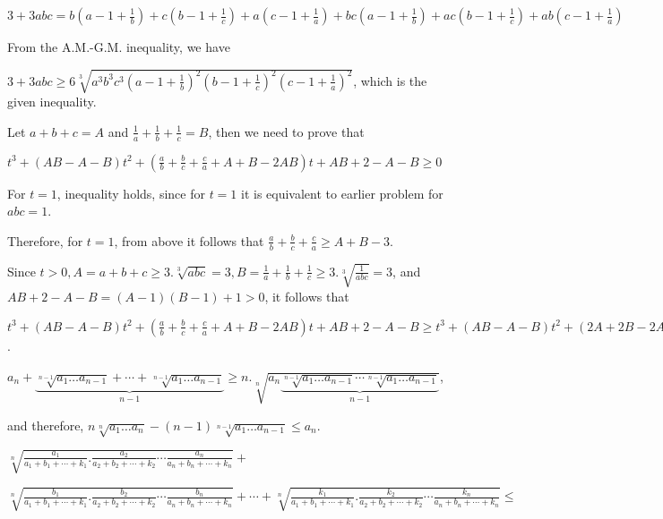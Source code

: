   $3 + 3abc = b\left(a - 1 + \frac{1}{b}\right) + c\left(b - 1 + \frac{1}{c}\right) + a\left(c - 1 +
  \frac{1}{a}\right) + bc\left(a - 1 + \frac{1}{b}\right) + ac\left(b - 1 + \frac{1}{c}\right) + ab\left(c -
  1 + \frac{1}{a}\right)$

  From the A.M.-G.M. inequality, we have

  $3 + 3abc\geq 6\sqrt[3]{a^3b^3c^3\left(a - 1 + \frac{1}{b}\right)^2\left(b - 1 +
    \frac{1}{c}\right)^2\left(c - 1 + \frac{1}{a}\right)^2}$, which is the given inequality.
\item Let $a + b + c = A$ and $\frac{1}{a} + \frac{1}{b} + \frac{1}{c} = B$, then we need to prove that

  $t^3 + (AB - A - B)t^2 + \left(\frac{a}{b} + \frac{b}{c} + \frac{c}{a} + A + B - 2AB\right)t + AB + 2 - A
  - B\geq 0$

  For $t = 1$, inequality holds, since for $t = 1$ it is equivalent to earlier problem for $abc = 1$.

  Therefore, for $t = 1$, from above it follows that $\frac{a}{b} + \frac{b}{c} + \frac{c}{a}\geq A + B -
  3$.

  Since $t > 0, A = a + b + c\geq 3.\sqrt[3]{abc} = 3, B = \frac{1}{a} + \frac{1}{b} + \frac{1}{c} \geq
  3.\sqrt[3]{\frac{1}{abc}} = 3$, and $AB + 2 - A - B = (A - 1)(B - 1) + 1 > 0$, it follows that

  $t^3 + (AB - A - B)t^2 + \left(\frac{a}{b} + \frac{b}{c} + \frac{c}{a} + A + B - 2AB\right)t + AB + 2 - A
  - B\geq t^3 + (AB - A - B)t^2 + (2A + 2B - 2AB - 3)t + AB + 2 - A - B = (t - 1)^2(t + AB + 2 - A - B)\geq
  0$.
\item $a_n + \underbrace{\sqrt[n - 1]{a_1\ldots a_{n - 1}} + \cdots + \sqrt[n - 1]{a_1\ldots a_{n - 1}}}_{n
  - 1}\geq n.\sqrt[n]{a_n\underbrace{\sqrt[n - 1]{a_1\ldots a_{n - 1}}\cdots \sqrt[n - 1]{a_1\ldots a_{n -
        1}}}_{n - 1}}$,

  and therefore, $n\sqrt[n]{a_1\ldots a_n} - (n - 1)\sqrt[n - 1]{a_1\ldots a_{n - 1}}\leq a_n$.
\item $\sqrt[n]{\frac{a_1}{a_1 + b_1 + \cdots + k_1}.\frac{a_2}{a_2 + b_2 + \cdots + k_2}\cdots
  \frac{a_n}{a_n + b_n + \cdots + k_n}} + $

  $\sqrt[n]{\frac{b_1}{a_1 + b_1 + \cdots + k_1}.\frac{b_2}{a_2 + b_2
    + \cdots + k_2}\cdots\frac{b_n}{a_n + b_n + \cdots + k_n}} + \cdots + \sqrt[n]{\frac{k_1}{a_1 + b_1 + \cdots
    + k_1}.\frac{k_2}{a_2 + b_2 + \cdots + k_2}\cdots \frac{k_n}{a_n + b_n + \cdots + k_n}}\leq$

